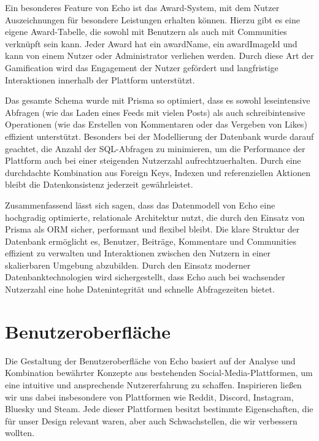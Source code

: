 \documentclass[a4paper,12pt]{article}
\begin{document}
Ein besonderes Feature von Echo ist das Award-System, mit dem Nutzer
Auszeichnungen für besondere Leistungen erhalten können. Hierzu gibt es eine
eigene Award-Tabelle, die sowohl mit Benutzern als auch mit Communities
verknüpft sein kann. Jeder Award hat ein awardName, ein awardImageId und kann
von einem Nutzer oder Administrator verliehen werden. Durch diese Art der
Gamification wird das Engagement der Nutzer gefördert und langfristige
Interaktionen innerhalb der Plattform unterstützt.

Das gesamte Schema wurde mit Prisma so optimiert, dass es sowohl leseintensive
Abfragen (wie das Laden eines Feeds mit vielen Posts) als auch schreibintensive
Operationen (wie das Erstellen von Kommentaren oder das Vergeben von Likes)
effizient unterstützt. Besonders bei der Modellierung der Datenbank wurde
darauf geachtet, die Anzahl der SQL-Abfragen zu minimieren, um die Performance
der Plattform auch bei einer steigenden Nutzerzahl aufrechtzuerhalten. Durch
eine durchdachte Kombination aus Foreign Keys, Indexen und referenziellen
Aktionen bleibt die Datenkonsistenz jederzeit gewährleistet.

Zusammenfassend lässt sich sagen, dass das Datenmodell von Echo eine hochgradig
optimierte, relationale Architektur nutzt, die durch den Einsatz von Prisma als
ORM sicher, performant und flexibel bleibt. Die klare Struktur der Datenbank
ermöglicht es, Benutzer, Beiträge, Kommentare und Communities effizient zu
verwalten und Interaktionen zwischen den Nutzern in einer skalierbaren Umgebung
abzubilden. Durch den Einsatz moderner Datenbanktechnologien wird
sichergestellt, dass Echo auch bei wachsender Nutzerzahl eine hohe
Datenintegrität und schnelle Abfragezeiten bietet.

\newpage
\section{Benutzeroberfläche}
Die Gestaltung der Benutzeroberfläche von Echo basiert auf der Analyse und
Kombination bewährter Konzepte aus bestehenden Social-Media-Plattformen, um
eine intuitive und ansprechende Nutzererfahrung zu schaffen. Inspirieren ließen
wir uns dabei insbesondere von Plattformen wie Reddit, Discord, Instagram,
Bluesky und Steam. Jede dieser Plattformen besitzt bestimmte Eigenschaften, die
für unser Design relevant waren, aber auch Schwachstellen, die wir verbessern
wollten.
\end{document}

